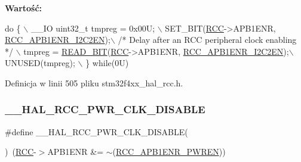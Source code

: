 {\bfseries Wartość\+:}
\begin{DoxyCode}
\textcolor{keywordflow}{do} \{ \(\backslash\)
                                        \_\_IO uint32\_t tmpreg = 0x00U; \(\backslash\)
                                        SET\_BIT(\hyperlink{group___peripheral__declaration_ga74944438a086975793d26ae48d5882d4}{RCC}->APB1ENR, 
      \hyperlink{group___peripheral___registers___bits___definition_gafd7d1c3c7dbe20aea87a694ae15840f6}{RCC\_APB1ENR\_I2C2EN});\(\backslash\)
                                        \textcolor{comment}{/* Delay after an RCC peripheral clock enabling */} \(\backslash\)
                                        tmpreg = \hyperlink{group___exported__macro_ga822bb1bb9710d5f2fa6396b84e583c33}{READ\_BIT}(\hyperlink{group___peripheral__declaration_ga74944438a086975793d26ae48d5882d4}{RCC}->APB1ENR, 
      \hyperlink{group___peripheral___registers___bits___definition_gafd7d1c3c7dbe20aea87a694ae15840f6}{RCC\_APB1ENR\_I2C2EN});\(\backslash\)
                                        UNUSED(tmpreg); \(\backslash\)
                                          \} \textcolor{keywordflow}{while}(0U)
\end{DoxyCode}


Definicja w linii 505 pliku stm32f4xx\+\_\+hal\+\_\+rcc.\+h.

\mbox{\label{group___r_c_c___a_p_b1___clock___enable___disable_gaf3db86d2db2bad45732a742b6a91ea0b}} 
\subsubsection{\texorpdfstring{\+\_\+\+\_\+\+H\+A\+L\+\_\+\+R\+C\+C\+\_\+\+P\+W\+R\+\_\+\+C\+L\+K\+\_\+\+D\+I\+S\+A\+B\+LE}{\_\_HAL\_RCC\_PWR\_CLK\_DISABLE}}
{\footnotesize\ttfamily \#define \+\_\+\+\_\+\+H\+A\+L\+\_\+\+R\+C\+C\+\_\+\+P\+W\+R\+\_\+\+C\+L\+K\+\_\+\+D\+I\+S\+A\+B\+LE(\begin{DoxyParamCaption}{ }\end{DoxyParamCaption})~(\hyperlink{group___peripheral__declaration_ga74944438a086975793d26ae48d5882d4}{R\+CC}-\/$>$A\+P\+B1\+E\+NR \&= $\sim$(\hyperlink{group___peripheral___registers___bits___definition_ga5c19997ccd28464b80a7c3325da0ca60}{R\+C\+C\+\_\+\+A\+P\+B1\+E\+N\+R\+\_\+\+P\+W\+R\+EN}))}



